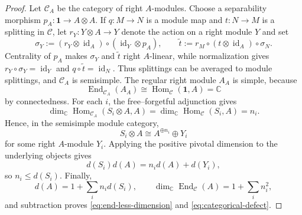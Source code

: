 \documentclass[11pt]{amsart}
\theoremstyle{definition}
\theoremstyle{remark}
\newcommand{\C}{\mathcal C}
\newcommand{\one}{\mathbf 1}
\newcommand{\CC}{\mathbb C}
\DeclareMathOperator{\Hom}{Hom}
\DeclareMathOperator{\End}{End}
\DeclareMathOperator{\id}{id}
\begin{document}
\begin{proof}
Let $\C_A$ be the category of right $A$-modules.  Choose a separability
morphism $p_A:\one\to A\otimes A$.  If $q:M\to N$ is a module map and
$t:N\to M$ is a splitting in $\C$, let $r_Y:Y\otimes A\to Y$ denote the
action on a right module $Y$ and set
\[
  \sigma_Y:=(r_Y\otimes\id_A)\circ(\id_Y\otimes p_A),\qquad
  \widetilde t:=r_M\circ(t\otimes\id_A)\circ\sigma_N.
\]
Centrality of $p_A$ makes $\sigma_Y$ and $\widetilde t$ right $A$-linear,
while normalization gives
$r_Y\circ\sigma_Y=\id_Y$ and $q\circ\widetilde t=\id_N$.  Thus splittings
can be averaged to module splittings, and $\C_A$ is semisimple.  The regular
right module $A_A$ is simple, because
\[
 \End_{\C_A}(A_A)\cong\Hom_{\C}(\one,A)=\CC
\]
by connectedness.  For each $i$, the free--forgetful adjunction gives
\[
 \dim_{\CC}\Hom_{\C_A}(S_i\otimes A,A)
 =\dim_{\CC}\Hom_{\C}(S_i,A)=n_i.
\]
Hence, in the semisimple module category,
\[
 S_i\otimes A\cong A^{\oplus n_i}\oplus Y_i
\]
for some right $A$-module $Y_i$.  Applying the positive pivotal dimension
to the underlying objects gives
\[
 d(S_i)d(A)=n_i d(A)+d(Y_i),
\]
so $n_i\leq d(S_i)$.  Finally,
\[
 d(A)=1+\sum_i n_i d(S_i),
 \qquad
 \dim_{\CC}\End_{\C}(A)=1+\sum_i n_i^2,
\]
and subtraction proves \eqref{eq:end-less-dimension} and
\eqref{eq:categorical-defect}.
\end{proof}
\end{document}
